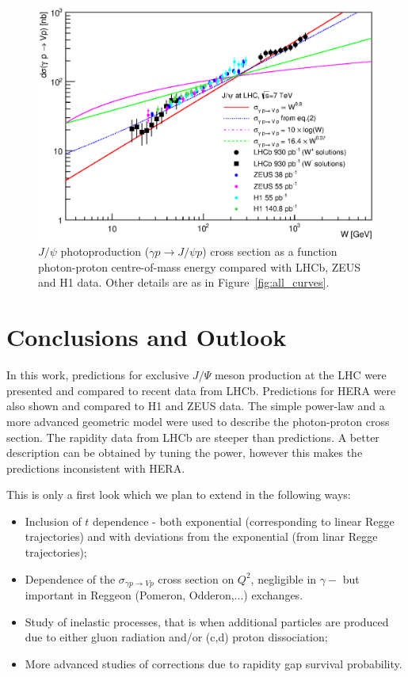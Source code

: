 \documentclass[12pt]{article}
\begin{document}


\begin{figure}[!h]
\centering
 \includegraphics[width=.8\textwidth]{figures/sigma_gamma_p_W_all_theory.eps}
 \caption{$J/\psi$ photoproduction ($\gamma p \to J/\psi p$) cross section as a function photon-proton centre-of-mass energy compared
           with LHCb, ZEUS and H1 data. Other details are as in Figure~\ref{fig:all_curves}.}
 \label{fig:all_curves_w}
\end{figure}

\clearpage
\section{Conclusions and Outlook}

In this work, predictions for exclusive $J/\Psi$ meson production at the LHC were presented and compared to recent data from LHCb.
Predictions for HERA were also shown and compared to H1 and ZEUS data.
The simple power-law and a more advanced geometric model were used to describe the photon-proton cross section.
The rapidity data from LHCb are steeper than predictions. A better description can be obtained by tuning the power,
however this makes the predictions inconsistent with HERA. 

This is only a first look which we plan to extend in the following ways:
\begin{itemize}
\item Inclusion of $t$ dependence - both exponential (corresponding to linear Regge trajectories) and with deviations from the exponential (from linar Regge trajectories);
\item Dependence of the $\sigma_{\gamma p \rightarrow V p}$ cross section on $Q^2$, negligible in $\gamma-$ but important in Reggeon (Pomeron, Odderon,...) exchanges.
\item Study of inelastic processes, that is when additional particles are produced due to either gluon radiation and/or (c,d) proton dissociation;
\item More advanced studies of corrections due to rapidity gap survival probability.
\end{itemize}
\end{document}
